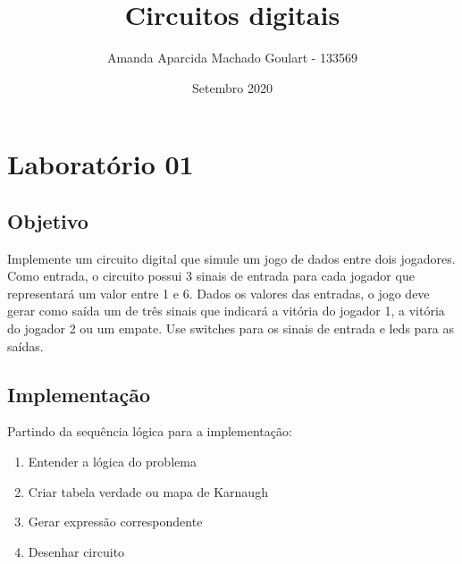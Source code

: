 \documentclass{article}
\title{Circuitos digitais}
\author{Amanda Aparcida Machado Goulart - 133569 }
\date{Setembro 2020}
\begin{document}
\maketitle

\section{Laboratório 01}

\subsection{Objetivo}
Implemente um circuito digital que simule um jogo de dados entre dois jogadores.
Como entrada, o circuito possui 3 sinais de entrada para cada jogador que representará um valor entre 1
e 6. Dados os valores das entradas, o jogo deve gerar como saída um de três sinais que indicará a
vitória do jogador 1, a vitória do jogador 2 ou um empate.
Use switches para os sinais de entrada e leds para as saídas.

\subsection{Implementação}

Partindo da sequência lógica para a implementação:

\begin{enumerate}
   \item Entender a lógica do problema
   \item Criar tabela verdade ou mapa de Karnaugh
   \item Gerar expressão correspondente
   \item Desenhar circuito
 \end{enumerate}
\end{document}
